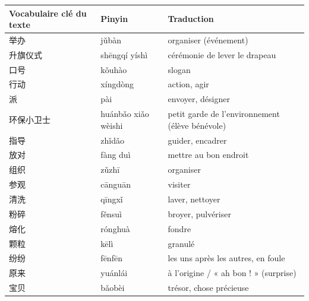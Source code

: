 \documentclass[11pt]{article}
\begin{document}
\begin{center}
\begin{tabularx}{\linewidth}{|X|X|X|}
\hline
\rowcolor{popblueL}
\textbf{Vocabulaire clé du texte} & \textbf{Pinyin} & \textbf{Traduction} \\
\hline
举办 & jǔbàn & organiser (événement) \\
\hline
升旗仪式 & shēngqí yíshì & cérémonie de lever le drapeau \\
\hline
口号 & kǒuhào & slogan \\
\hline
行动 & xíngdòng & action, agir \\
\hline
派 & pài & envoyer, désigner \\
\hline
环保小卫士 & huánbǎo xiǎo wèishi & petit garde de l'environnement (élève bénévole) \\
\hline
指导 & zhǐdǎo & guider, encadrer \\
\hline
放对 & fàng duì & mettre au bon endroit \\
\hline
组织 & zǔzhī & organiser \\
\hline
参观 & cānguān & visiter \\
\hline
清洗 & qīngxǐ & laver, nettoyer \\
\hline
粉碎 & fěnsuì & broyer, pulvériser \\
\hline
熔化 & rónghuà & fondre \\
\hline
颗粒 & kēlì & granulé \\
\hline
纷纷 & fēnfēn & les uns après les autres, en foule \\
\hline
原来 & yuánlái & à l'origine / « ah bon ! » (surprise) \\
\hline
宝贝 & bǎobèi & trésor, chose précieuse \\
\hline
\end{tabularx}
\end{center}
\end{document}
